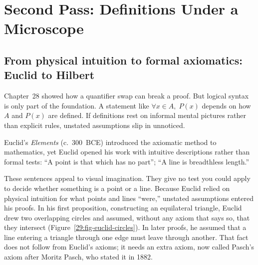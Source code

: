 \section{Second Pass: Definitions Under a Microscope}
\chapterline

\subsection{From physical intuition to formal axiomatics: Euclid to Hilbert}

Chapter~28 showed how a quantifier swap can break a proof. But logical syntax is only part of the foundation. A statement like $\forall x \in A, \; P(x)$ depends on how $A$ and $P(x)$ are defined. If definitions rest on informal mental pictures rather than explicit rules, unstated assumptions slip in unnoticed.

Euclid's \emph{Elements} (c.~300~BCE) introduced the axiomatic method to mathematics, yet Euclid opened his work with intuitive descriptions rather than formal tests: ``A point is that which has no part''; ``A line is breadthless length.''

These sentences appeal to visual imagination. They give no test you could apply to decide whether something is a point or a line. Because Euclid relied on physical intuition for what points and lines ``were,'' unstated assumptions entered his proofs. In his first proposition, constructing an equilateral triangle, Euclid drew two overlapping circles and assumed, without any axiom that says so, that they intersect (Figure~\ref{29:fig-euclid-circles}). In later proofs, he assumed that a line entering a triangle through one edge must leave through another. That fact does not follow from Euclid's axioms; it needs an extra axiom, now called Pasch's axiom after Moritz Pasch, who stated it in 1882.

